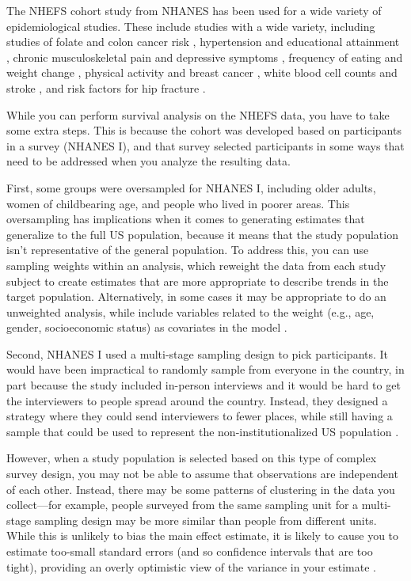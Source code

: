 \documentclass[
]{book}
\begin{document}
The NHEFS cohort study from NHANES has been used for a wide variety of epidemiological studies. These include studies with a wide variety, including studies of folate and colon cancer risk \citep{su2001nutritional}, hypertension and educational attainment \citep{vargas2000incidence}, chronic musculoskeletal pain and depressive symptoms \citep{magni1993chronic}, frequency of eating and weight change \citep{kant1995frequency}, physical activity and breast cancer \citep{breslow2001long}, white blood cell counts and stroke \citep{gillum1994white}, and risk factors for hip fracture \citep{mussolino1998risk}.

While you can perform survival analysis on the NHEFS data, you have to take some extra steps. This is because the cohort was developed based on participants in a survey (NHANES I), and that survey selected participants in some ways that need to be addressed when you analyze the resulting data.

First, some groups were oversampled for NHANES I, including older adults, women of childbearing age, and people who lived in poorer areas. This oversampling has implications when it comes to generating estimates that generalize to the full US population, because it means that the study population isn't representative of the general population. To address this, you can use sampling weights within an analysis, which reweight the data from each study subject to create estimates that are more appropriate to describe trends in the target population. Alternatively, in some cases it may be appropriate to do an unweighted analysis, while include variables related to the weight (e.g., age, gender, socioeconomic status) as covariates in the model \citep{korn1991epidemiologic}.

Second, NHANES I used a multi-stage sampling design to pick participants. It would have been impractical to randomly sample from everyone in the country, in part because the study included in-person interviews and it would be hard to get the interviewers to people spread around the country. Instead, they designed a strategy where they could send interviewers to fewer places, while still having a sample that could be used to represent the non-institutionalized US population \citep{korn1991epidemiologic}.

However, when a study population is selected based on this type of complex survey design, you may not be able to assume that observations are independent of each other. Instead, there may be some patterns of clustering in the data you collect---for example, people surveyed from the same sampling unit for a multi-stage sampling design may be more similar than people from different units. While this is unlikely to bias the main effect estimate, it is likely to cause you to estimate too-small standard errors (and so confidence intervals that are too tight), providing an overly optimistic view of the variance in your estimate \citep{korn1991epidemiologic}.
\end{document}
